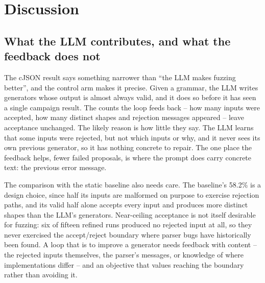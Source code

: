 \section{Discussion}
\label{sec:discussion}

\subsection{What the LLM contributes, and what the feedback does not}
The cJSON result says something narrower than ``the LLM makes fuzzing
better'', and the control arm makes it precise. Given a grammar, the LLM
writes generators whose output is almost always valid, and it does so
before it has seen a single campaign result. The counts the loop feeds back
-- how many inputs were accepted, how many distinct shapes and rejection
messages appeared -- leave acceptance unchanged. The likely reason is how
little they say. The LLM learns that some inputs were rejected, but not
which inputs or why, and it never sees its own previous generator, so it
has nothing concrete to repair. The one place the feedback helps, fewer
failed proposals, is where the prompt does carry concrete text: the
previous error message.

The comparison with the static baseline also needs care. The baseline's
58.2\% is a design choice, since half its inputs are malformed on purpose
to exercise rejection paths, and its valid half alone accepts every input
and produces more distinct shapes than the LLM's generators. Near-ceiling
acceptance is not itself desirable for fuzzing: six of fifteen refined runs
produced no rejected input at all, so they never exercised the
accept/reject boundary where parser bugs have historically been found. A
loop that is to improve a generator needs feedback with content -- the
rejected inputs themselves, the parser's messages, or knowledge of where
implementations differ -- and an objective that values reaching the
boundary rather than avoiding it.

